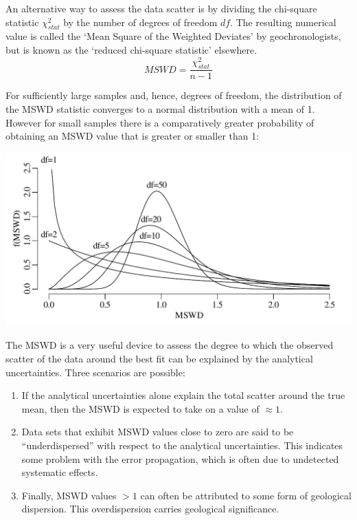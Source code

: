 \begin{refsection}
An alternative way to assess the data scatter is by dividing the
chi-square statistic $\chi^2_{stat}$ by the number of degrees of
freedom $df$.  The resulting numerical value is called the `Mean
Square of the Weighted Deviates' \citep[MSWD,][]{mcintyre1966} by
geochronologists, but is known as the `reduced chi-square statistic'
elsewhere.
\begin{equation}
  MSWD = \frac{\chi^2_{stat}}{n-1}
  \label{eq:mswd}
\end{equation}

For sufficiently large samples and, hence, degrees of
freedom, the distribution of the MSWD statistic converges to a normal
distribution with a mean of 1. However for small samples there is a
comparatively greater probability of obtaining an MSWD value that is
greater or smaller than 1:

\noindent\begin{minipage}[t]{.7\textwidth}
\strut\vspace*{-\baselineskip}\newline
\includegraphics[width=\textwidth]{../figures/mswd.pdf}
\end{minipage}
\begin{minipage}[t]{.3\textwidth}
  \label{fig:mswd}
\end{minipage}

The MSWD is a very useful device to assess the degree to which the
observed scatter of the data around the best fit can be explained by
the analytical uncertainties. Three scenarios are possible:

\begin{enumerate}
  \item If the analytical uncertainties alone explain the total
    scatter around the true mean, then the MSWD is expected to take on
    a value of $\approx{1}$.
\item Data sets that exhibit MSWD values close to zero are said to be
  ``underdispersed'' with respect to the analytical
  uncertainties. This indicates some problem with the error
  propagation, which is often due to undetected systematic effects.
\item Finally, MSWD values $>1$ can often be attributed to some form
  of geological dispersion. This overdispersion carries geological
  significance.
\end{enumerate}


\end{refsection}
